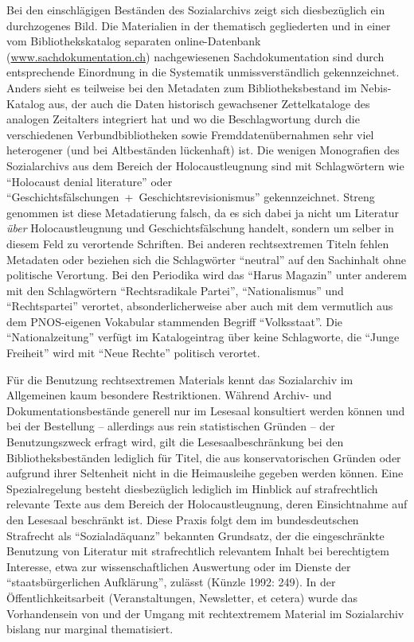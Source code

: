 \documentclass[a4paper,
fontsize=11pt,
oneside,
numbers=noperiodatend,
parskip=half-,
bibliography=totoc,
final
]{scrartcl}
\begin{document}
Bei den einschlägigen Beständen des Sozialarchivs zeigt sich
diesbezüglich ein durchzogenes Bild. Die Materialien in der thematisch
gegliederten und in einer vom Bibliothekskatalog separaten
online-Datenbank (\url{www.sachdokumentation.ch}) nachgewiesenen
Sachdokumentation sind durch entsprechende Einordnung in die Systematik
unmissverständlich gekennzeichnet. Anders sieht es teilweise bei den
Metadaten zum Bibliotheksbestand im Nebis-Katalog aus, der auch die
Daten historisch gewachsener Zettelkataloge des analogen Zeitalters
integriert hat und wo die Beschlagwortung durch die verschiedenen
Verbundbibliotheken sowie Fremddatenübernahmen sehr viel heterogener
(und bei Altbeständen lückenhaft) ist. Die wenigen Monografien des
Sozialarchivs aus dem Bereich der Holocaustleugnung sind mit
Schlagwörtern wie \enquote{Holocaust denial literature} oder
\enquote{Geschichtsfälschungen~+~Geschichtsrevisionismus}
gekennzeichnet. Streng genommen ist diese Metadatierung falsch, da es
sich dabei ja nicht um Literatur \emph{über} Holocaustleugnung und
Geschichtsfälschung handelt, sondern um selber in diesem Feld zu
verortende Schriften. Bei anderen rechtsextremen Titeln fehlen Metadaten
oder beziehen sich die Schlagwörter \enquote{neutral} auf den Sachinhalt
ohne politische Verortung. Bei den Periodika wird das \enquote{Harus
Magazin} unter anderem mit den Schlagwörtern \enquote{Rechtsradikale
Partei}, \enquote{Nationalismus} und \enquote{Rechtspartei} verortet,
absonderlicherweise aber auch mit dem vermutlich aus dem PNOS-eigenen
Vokabular stammenden Begriff \enquote{Volksstaat}. Die
\enquote{Nationalzeitung} verfügt im Katalogeintrag über keine
Schlagworte, die \enquote{Junge Freiheit} wird mit \enquote{Neue Rechte}
politisch verortet.

Für die Benutzung rechtsextremen Materials kennt das Sozialarchiv im
Allgemeinen kaum besondere Restriktionen. Während Archiv- und
Dokumentationsbestände generell nur im Lesesaal konsultiert werden
können und bei der Bestellung -- allerdings aus rein statistischen
Gründen -- der Benutzungszweck erfragt wird, gilt die
Lesesaalbeschränkung bei den Bibliotheksbeständen lediglich für Titel,
die aus konservatorischen Gründen oder aufgrund ihrer Seltenheit nicht
in die Heimausleihe gegeben werden können. Eine Spezialregelung besteht
diesbezüglich lediglich im Hinblick auf strafrechtlich relevante Texte
aus dem Bereich der Holocaustleugnung, deren Einsichtnahme auf den
Lesesaal beschränkt ist. Diese Praxis folgt dem im bundesdeutschen
Strafrecht als \enquote{Sozialadäquanz} bekannten Grundsatz, der die
eingeschränkte Benutzung von Literatur mit strafrechtlich relevantem
Inhalt bei berechtigtem Interesse, etwa zur wissenschaftlichen
Auswertung oder im Dienste der \enquote{staatsbürgerlichen Aufklärung},
zulässt (Künzle 1992: 249). In der Öffentlichkeitsarbeit
(Veranstaltungen, Newsletter, et cetera) wurde das Vorhandensein von und
der Umgang mit rechtextremem Material im Sozialarchiv bislang nur
marginal thematisiert.
\end{document}
